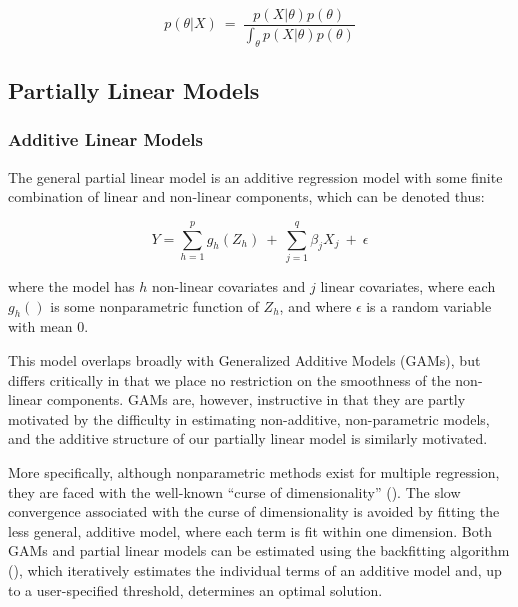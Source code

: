 \documentclass[10pt]{olplainarticle}\usepackage[]{graphicx}\usepackage[]{color}
\begin{document}
\begin{equation} \label{bayes}
  p(\theta | X) \ =\ \frac{p(X|\theta)p(\theta)}{\int_{\theta}p(X|\theta)p(\theta)}
\end{equation}




\subsection{Partially Linear Models}

\subsubsection{Additive Linear Models} \label{gams}

The general partial linear model is an additive regression model with some finite combination of linear and non-linear components, which can be denoted thus:

\begin{equation} \label{partlin}
  Y = \sum_{h=1}^{p} g_{h} (Z_{h}) \ +\  \sum_{j=1}^{q} \beta_{j} X_{j} \ +\ \epsilon
\end{equation}

where the model has $h$ non-linear covariates and $j$ linear covariates, where each $g_{h}()$ is some nonparametric function of $Z_{h}$, and where $\epsilon$ is a random variable with mean $0$.

This model overlaps broadly with Generalized Additive Models (GAMs), but differs critically in that we place no restriction on the smoothness of the non-linear components. GAMs are, however, instructive in that they are partly motivated by the difficulty in estimating non-additive, non-parametric models, and the additive structure of our partially linear model is similarly motivated.

More specifically, although nonparametric methods exist for multiple regression, they are faced with the well-known ``curse of dimensionality'' (\cite{curse}). The slow convergence associated with the curse of dimensionality is avoided by fitting the less general, additive model, where each term is fit within one dimension. Both GAMs and partial linear models can be estimated using the backfitting algorithm (\cite{backfit}), which iteratively estimates the individual terms of an additive model and, up to a user-specified threshold, determines an optimal solution.
\end{document}
